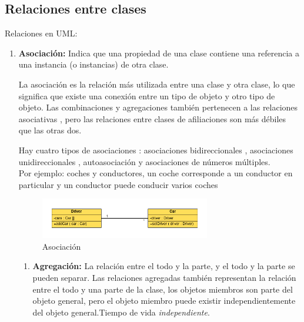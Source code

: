 \documentclass[../main.tex]{subfiles}
\begin{document}
    \subsection{Relaciones entre clases}
        Relaciones en UML: \cite{uml_relacion_clases}
        \begin{enumerate}
            \item \textbf{Asociación:} Indica que una propiedad de una clase contiene una referencia a una instancia (o instancias) de otra clase.
            
            La asociación es la relación más utilizada entre una clase y otra clase, lo que significa que existe una conexión entre un tipo de objeto y otro tipo de objeto. Las combinaciones y agregaciones también pertenecen a las relaciones asociativas , pero las relaciones entre clases de afiliaciones son más débiles que las otras dos.
            
            Hay cuatro tipos de asociaciones : asociaciones bidireccionales , asociaciones unidireccionales , autoasociación y asociaciones de números múltiples.\\
            
            Por ejemplo: coches y conductores, un coche corresponde a un conductor en particular y un conductor puede conducir varios coches

            \begin{figure}[ht]
                \centering
                \includegraphics[width=0.7\textwidth]{../images/uml_asociacion.png}
                \caption{Asociación}
                \label{fig:uml_asociacion}
            \end{figure}

                \begin{enumerate}
                    \item \textbf{Agregación:} 
                        La relación entre el todo y la parte, y el todo y la parte se pueden separar.
                        Las relaciones agregadas también representan la relación entre el todo y una parte de la clase, los objetos miembros son parte del objeto general, pero el objeto miembro puede existir independientemente del objeto general.Tiempo de vida \textit{independiente}.\\


\end{enumerate}
\end{enumerate}
\end{document}
